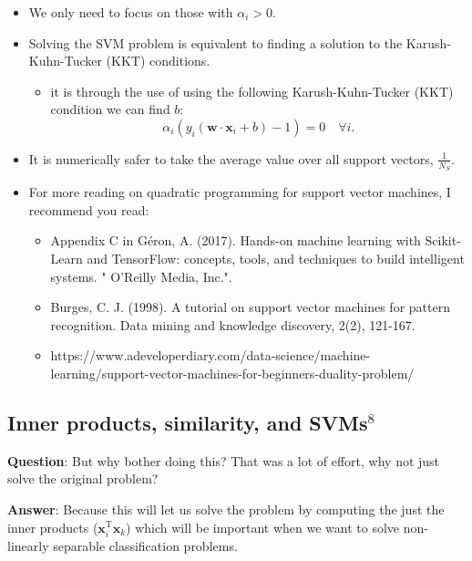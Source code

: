 \documentclass[11pt]{article}
\providecommand{\tightlist}{%
      \setlength{\itemsep}{0pt}\setlength{\parskip}{0pt}}
\begin{document}
\begin{itemize}
\tightlist
\item
  We only need to focus on those with \(\alpha_i > 0\).
\item
  Solving the SVM problem is equivalent to finding a solution to the
  Karush-Kuhn-Tucker (KKT) conditions.

  \begin{itemize}
  \tightlist
  \item
    it is through the use of using the following Karush-Kuhn-Tucker
    (KKT) condition we can find \(b\): \[
    \alpha_i(y_i(\mathbf{w} \cdot \mathbf{x}_i + b) - 1) = 0 \quad \forall i.
    \]
  \end{itemize}
\item
  It is numerically safer to take the average value over all support
  vectors, \(\frac{1}{N_S}\).
\item
  For more reading on quadratic programming for support vector machines,
  I recommend you read:

  \begin{itemize}
  \tightlist
  \item
    Appendix C in Géron, A. (2017). Hands-on machine learning with
    Scikit-Learn and TensorFlow: concepts, tools, and techniques to
    build intelligent systems. " O'Reilly Media, Inc.".
  \item
    Burges, C. J. (1998). A tutorial on support vector machines for
    pattern recognition. Data mining and knowledge discovery, 2(2),
    121-167.
  \item
    https://www.adeveloperdiary.com/data-science/machine-learning/support-vector-machines-for-beginners-duality-problem/
  \end{itemize}
\end{itemize}

    \hypertarget{inner-products-similarity-and-svms8}{%
\subsection{\texorpdfstring{Inner products, similarity, and
SVMs\(^8\)}{Inner products, similarity, and SVMs\^{}8}}\label{inner-products-similarity-and-svms8}}

\textbf{Question}: But why bother doing this? That was a lot of effort,
why not just solve the original problem?

\textbf{Answer}: Because this will let us solve the problem by computing
the just the inner products (\(\mathbf{x}_i^{\mathrm T} \mathbf{x}_k\))
which will be important when we want to solve non-linearly separable
classification problems.
\end{document}

